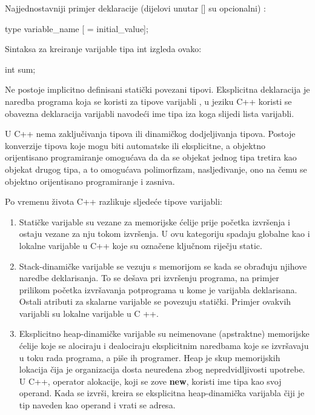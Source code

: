 \documentclass[11pt]{book}
\begin{document}
Najjednostavniji primjer deklaracije (dijelovi unutar [] su opcionalni) :

\begin{shortlisting}
  [specifier(s)] type variable_name [ = initial_value];
\end{shortlisting}

Sintaksa za kreiranje varijable tipa int izgleda ovako:

\begin{shortlisting}
  int sum;
\end{shortlisting}

Ne postoje implicitno definisani statički povezani tipovi. Eksplicitna deklaracija je naredba programa koja se koristi za tipove varijabli ,  u jeziku C++ koristi se obavezna deklaracija varijabli navodeći ime tipa iza koga slijedi lista varijabli.

U C++ nema zaključivanja  tipova  ili  dinamičkog  dodjeljivanja  tipova.
Postoje  konverzije  tipova  koje  mogu  biti  automatske  ili  eksplicitne,  a  objektno  orijentisano programiranje omogućava da da se objekat jednog tipa tretira kao objekat drugog tipa, a to omogućava polimorfizam, nasljeđivanje, ono na čemu se objektno orijentisano programiranje i  zasniva.

Po vremenu života C++ razlikuje sljedeće tipove varijabli:
\begin{enumerate}
  \item Statičke varijable su vezane za memorijske ćelije prije početka izvršenja i ostaju vezane za nju tokom  izvršenja.  U  ovu  kategoriju  spadaju  globalne  kao  i  lokalne  varijable  u  C++  koje  su označene ključnom riječju static.

  \item Stack-dinamičke  varijable  se  vezuju  s  memorijom  se  kada  se  obrađuju  njihove  naredbe deklarisanja. To se dešava pri izvršenju programa, na primjer prilikom početka izvršavanja potprograma u kome je varijabla deklarisana. Ostali atributi za skalarne varijable se povezuju statički. Primjer ovakvih varijabli su lokalne varijable u C ++.

  \item Eksplicitno heap-dinamičke varijable su neimenovane (apstraktne) memorijske ćelije koje se alociraju i dealociraju eksplicitnim naredbama koje se izvršavaju u toku rada programa, a piše ih programer. Heap je skup memorijskih lokacija čija je organizacija dosta neuređena zbog nepredvidljivosti upotrebe. U C++, operator alokacije, koji se zove \textbf{new}, koristi ime tipa kao svoj operand. Kada se izvrši, kreira se eksplicitna heap-dinamička varijabla čiji je tip naveden kao operand i vrati se adresa.
\end{enumerate}
\end{document}
